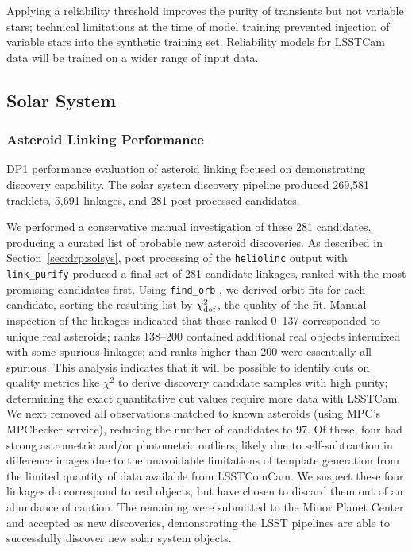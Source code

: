 Applying a reliability threshold improves the purity of transients but not variable stars; technical limitations at the time of model training prevented injection of variable stars into the synthetic training set.
Reliability models for LSSTCam data will be trained on a wider range of input data.

\subsection{Solar System}
\label{sec:performance:solsys}

\subsubsection{Asteroid Linking Performance}

DP1 performance evaluation of asteroid linking focused on demonstrating discovery capability. 
The solar system discovery pipeline produced 269,581 tracklets, 5,691 linkages, and 281 post-processed candidates. 

We performed a conservative manual investigation of these 281 candidates, producing a curated list of \nnewasteroiddiscoveries probable new asteroid discoveries. 
As described in Section~\ref{sec:drp:solsys}, post processing of the {\tt heliolinc} output with {\tt link\_purify} produced a final set of 281 candidate linkages, ranked with the most promising candidates first. 
Using {\tt find\_orb} \citep{findorb}, we derived orbit fits for each candidate, sorting the resulting list by $\chi_{\rm dof}^2$, the quality of the fit. 
Manual inspection of the linkages indicated that those ranked 0--137 corresponded to unique real asteroids; ranks 138--200 contained additional real objects intermixed with some spurious linkages; and ranks higher than 200 were essentially all spurious. 
This analysis indicates that it will be possible to identify cuts on quality metrics like $\chi^2$ to derive discovery candidate samples with high purity; determining the exact quantitative cut values require more data with LSSTCam.
We next removed all observations matched to known asteroids (using MPC's MPChecker service), reducing the number of candidates to 97. 
Of these, four had strong astrometric and/or photometric outliers, likely due to self-subtraction in difference images due to the unavoidable limitations of template generation from the limited quantity of data available from  LSSTComCam. 
We suspect these four linkages do correspond to real objects, but have chosen to discard them out of an abundance of caution. 
The remaining \nnewasteroiddiscoveries were submitted to the Minor Planet Center and accepted as new discoveries, demonstrating the LSST pipelines are able to successfully discover new solar system objects. 

